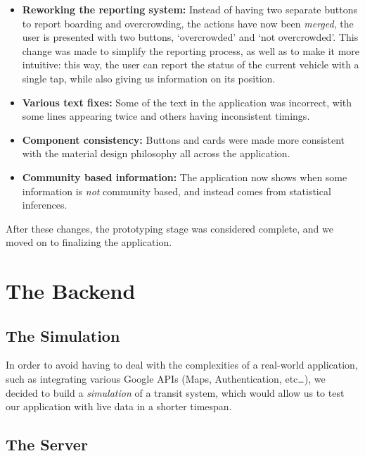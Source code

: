 \documentclass[a4paper, 11pt]{report}
\begin{document}
\begin{itemize}
	\item \textbf{Reworking the reporting system:} Instead of having two separate
	      buttons to report boarding and overcrowding, the actions have now been \emph{merged}, the user is presented with two buttons, `overcrowded' and `not overcrowded'. This change was made to simplify the reporting process, as well as to make it more intuitive: this way, the user can report the status of the current vehicle with a single tap, while also giving us information on its position.
	\item \textbf{Various text fixes:} Some of the text in the application was
	      incorrect, with some lines appearing twice and others having inconsistent
	      timings.
	\item \textbf{Component consistency:} Buttons and cards were made more consistent with
	      the material design philosophy all across the application.
	\item \textbf{Community based information:} The application now shows when
	      some information is \emph{not} community based, and instead comes from
	      statistical inferences.
\end{itemize}

After these changes, the prototyping stage was considered complete, and we
moved on to finalizing the application.

\section{The Backend}\label{sec:the-backend}

\subsection{The Simulation}\label{ssec:the-simulation}

In order to avoid having to deal with the complexities of a real-world application,
such as integrating various Google APIs (Maps, Authentication, etc\dots), we decided to build a \emph{simulation} of a transit system, which would allow us to test our application with live data in a shorter timespan.



\subsection{The Server}\label{ssec:the-server}
\end{document}

